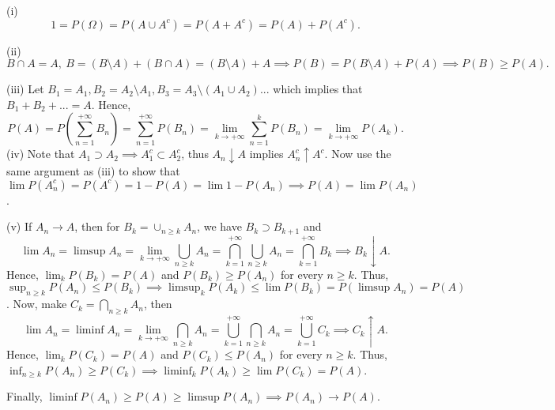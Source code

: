 \begin{prf}

	(i)
	\begin{equation*}
		1=P(\Omega) = P(A \cup A^c) = P(A + A^c) = P(A) + P(A^c).
	\end{equation*}

	(ii)
	\begin{equation*}
		B\cap A = A, \ B = (B\setminus A)+ (B \cap A) =
		(B\setminus A)+ A \implies P(B) = P(B\setminus A) + P(A) \implies P(B) \geq P(A).
	\end{equation*}

	(iii) Let $B_1 = A_1, B_2 = A_2 \setminus A_1, B_3 = A_3 \setminus(A_1 \cup A_2) ...$ which implies
	that $B_1 + B_2 + ... = A$. Hence,
	\begin{equation*}
		P(A) = P(\sum_{n=1}^{+\infty} B_n) =
		\sum_{n=1}^{+\infty} P(B_n) =
		\lim_{k\to +\infty}\sum_{n=1}^{k} P(B_n) = \lim_{k\to+\infty} P(A_k).
	\end{equation*}
	(iv) Note that $A_1 \supset A_2 \implies A_1^c \subset A_2^c$, thus
	$A_n \downarrow A$ implies $A_n^c \uparrow A^c$. Now use the same argument as (iii)
	to show that $\lim P(A_n^c) = P(A^c) = 1 - P(A) = \lim 1 - P(A_n) \implies P(A) = \lim P(A_n)$.

	\vspace{1cm}
	(v) If $A_n \to A$, then for $B_k = \cup_{n \geq k} A_n$, we have $B_k \supset B_{k+1}$ and
	\begin{equation*}
		\lim A_n = \limsup A_n = \lim_{k\to +\infty}\bigcup_{n\geq k}A_n
		=\bigcap_{k=1}^{+\infty}\bigcup_{n\geq k}A_n
		=\bigcap_{k=1}^{+\infty}B_k \implies B_k \downarrow A.
	\end{equation*}
	Hence, $\lim_k P(B_k) = P(A)$ and $P(B_k) \geq P(A_n)$ for every $n \geq k$. Thus,
	$\sup_{n\geq k}P(A_n) \leq P(B_k) \implies \limsup_k P(A_k) \leq \lim P(B_k) = P(\limsup A_n)= P(A)$.
	Now, make $C_k = \bigcap_{n\geq k}A_n$, then
	\begin{equation*}
		\lim A_n = \liminf A_n = \lim_{k\to +\infty}\bigcap_{n\geq k}A_n
		=\bigcup_{k=1}^{+\infty}\bigcap_{n\geq k}A_n
		=\bigcup_{k=1}^{+\infty}C_k \implies C_k \uparrow A.
	\end{equation*}
	Hence, $\lim_k P(C_k) = P(A)$ and $P(C_k) \leq P(A_n)$ for every $n \geq k$. Thus,
	$\inf_{n \geq k}P(A_n)\geq P(C_k) \implies \liminf_k P(A_k) \geq \lim P(C_k)=P(A)$.

	Finally, $\liminf P(A_n) \geq P(A) \geq \limsup P(A_n) \implies P(A_n) \to P(A)$.

\end{prf}

